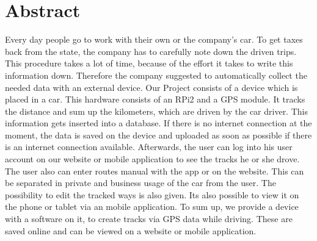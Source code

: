\chapter*{Abstract}
Every day people go to work with their own or the company's car. To get taxes back from the state, the company has to carefully note down the driven trips. This procedure takes a lot of time,  because of the effort it takes to write this information down. Therefore the company suggested to automatically collect the needed data with an external device.
\newline \newline
Our Project consists of a device which is placed in a car. This hardware consists of an RPi2 and a GPS module. It tracks the distance and sum up the kilometers, which are driven by the car driver. This information gets inserted into a database. If there is no internet connection at the moment, the data is saved on the device and uploaded as soon as possible if there is an internet connection available. Afterwards, the user can log into his user account on our website or mobile application to see the tracks he or she drove. The user also can enter routes manual with the app or on the website. This can be separated in private and business usage of the car from the user. The possibility to edit the tracked ways is also given. Its also possible to view it on the phone or tablet via an mobile application.
\newline \newline
To sum up, we provide a device with a software on it, to create tracks via GPS data while driving. These are saved online and can be viewed on a website or mobile application.